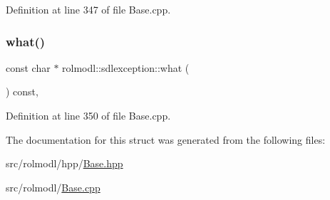 Definition at line 347 of file Base.\+cpp.

\mbox{\label{structrolmodl_1_1sdlexception_a5c2efc9d1fefa9e8829688063641541c}} 
\subsubsection{\texorpdfstring{what()}{what()}}
{\footnotesize\ttfamily const char $\ast$ rolmodl\+::sdlexception\+::what (\begin{DoxyParamCaption}{ }\end{DoxyParamCaption}) const\hspace{0.3cm}{\ttfamily [override]}, {\ttfamily [noexcept]}}



Definition at line 350 of file Base.\+cpp.



The documentation for this struct was generated from the following files\+:\begin{DoxyCompactItemize}
\item 
src/rolmodl/hpp/\mbox{\hyperlink{_base_8hpp}{Base.\+hpp}}\item 
src/rolmodl/\mbox{\hyperlink{_base_8cpp}{Base.\+cpp}}\end{DoxyCompactItemize}
